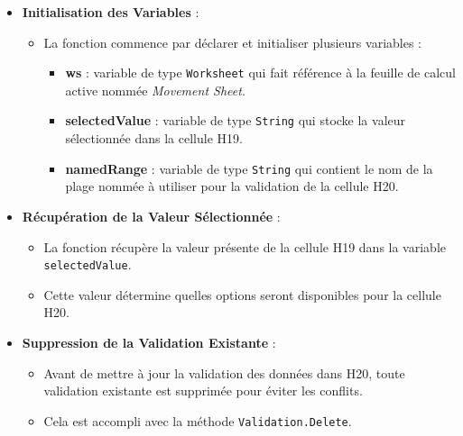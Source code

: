\documentclass[a4paper, oneside, 12pt, final]{extreport}
\begin{document}
\begin{itemize}
    \item \textbf{Initialisation des Variables} :
    \begin{itemize}
        \item La fonction commence par déclarer et initialiser plusieurs variables :
        \begin{itemize}
            \item \textbf{ws} : variable de type \texttt{Worksheet} qui fait référence à la feuille de calcul active nommée \textit{Movement Sheet}.
            \item \textbf{selectedValue} : variable de type \texttt{String} qui stocke la valeur sélectionnée dans la cellule H19.
            \item \textbf{namedRange} : variable de type \texttt{String} qui contient le nom de la plage nommée à utiliser pour la validation de la cellule H20.
        \end{itemize}
    \end{itemize}

    \item \textbf{Récupération de la Valeur Sélectionnée} :
    \begin{itemize}
        \item La fonction récupère la valeur présente de la cellule H19 dans la variable \texttt{selectedValue}.
        \item Cette valeur détermine quelles options seront disponibles pour la cellule H20.
    \end{itemize}

    \item \textbf{Suppression de la Validation Existante} :
    \begin{itemize}
        \item Avant de mettre à jour la validation des données dans H20, toute validation existante est supprimée pour éviter les conflits.
        \item Cela est accompli avec la méthode \texttt{Validation.Delete}.
    \end{itemize}


\end{itemize}
\end{document}
